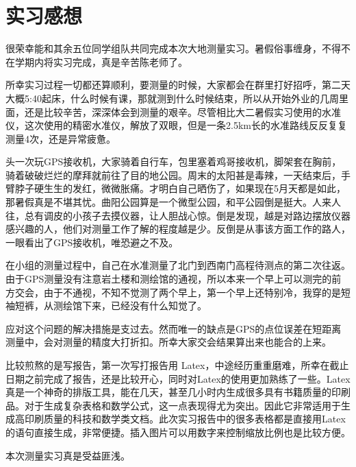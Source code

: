 \documentclass[a4paper,16pt,UTF8]{article}
\begin{document}
\newpage
\section{\LARGE 实习感想}

很荣幸能和其余五位同学组队共同完成本次大地测量实习。暑假俗事缠身，不得不在学期内将实习完成，真是辛苦陈老师了。

所幸实习过程一切都还算顺利，要测量的时候，大家都会在群里打好招呼，第二天大概5:40起床，什么时候有课，那就测到什么时候结束，所以从开始外业的几周里面，还是比较辛苦，深深体会到测量的艰辛。尽管相比大二暑假实习使用的水准仪，这次使用的精密水准仪，解放了双眼，但是一条2.5km长的水准路线反反复复测量4次，还是异常疲惫。

头一次玩GPS接收机，大家骑着自行车，包里塞着鸡哥接收机，脚架套在胸前，骑着破破烂烂的摩拜就前往了目的地公园。周末的太阳甚是毒辣，一天结束后，手臂脖子硬生生的发红，微微胀痛。才明白自己晒伤了，如果现在5月天都是如此，那暑假真是不堪其忧。曲阳公园算是一个微型公园，和平公园倒是挺大。人来人往，总有调皮的小孩子去摸仪器，让人胆战心惊。倒是发现，越是对路边摆放仪器感兴趣的人，他们对测量工作了解的程度越是少。反倒是从事该方面工作的路人，一眼看出了GPS接收机，唯恐避之不及。

在小组的测量过程中，自己在水准测量了北门到西南门高程待测点的第二次往返。由于GPS测量没有注意岩土楼和测绘馆的通视，所以本来一个早上可以测完的前方交会，由于不通视，不知不觉测了两个早上，第一个早上还特别冷，我穿的是短袖短裤，从测绘馆下来，已经没有什么知觉了。

应对这个问题的解决措施是支过去。然而唯一的缺点是GPS的点位误差在短距离测量中，会对测量的精度大打折扣。所幸大家交会结果算出来也能合的上来。

比较煎熬的是写报告，第一次写打报告用 Latex，中途经历重重磨难，所幸在截止日期之前完成了报告，还是比较开心，同时对Latex的使用更加熟练了一些。Latex真是一个神奇的排版工具，能在几天，甚至几小时内生成很多具有书籍质量的印刷品。对于生成复杂表格和数学公式，这一点表现得尤为突出。因此它非常适用于生成高印刷质量的科技和数学类文档。此次实习报告中的很多表格都是直接用Latex的语句直接生成，非常便捷。插入图片可以用数字来控制缩放比例也是比较方便。

本次测量实习真是受益匪浅。
\end{document}

